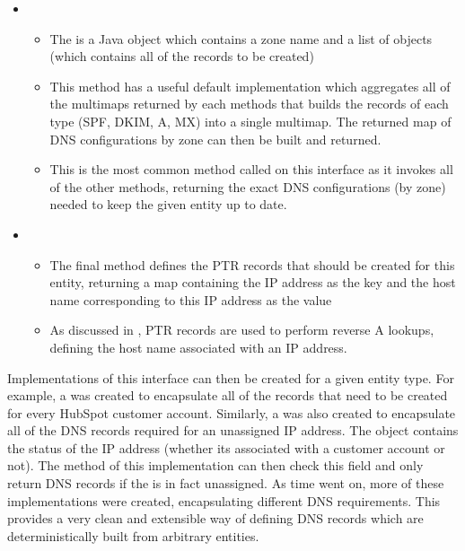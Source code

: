 \begin{itemize}
      \item{}
      \begin{itemize}
            \item{The  is a Java object which contains a zone name and a list of  objects (which contains all of the records to be created)}
            \item{This method has a useful default implementation which aggregates all of the multimaps returned by each methods that builds the records of each type (SPF, DKIM, A, MX) into a single multimap. The returned map of DNS configurations by zone can then be built and returned.}
            \item{This is the most common method called on this interface as it invokes all of the other methods, returning the exact DNS configurations (by zone) needed to keep the given entity up to date.}
      \end{itemize}

      \item{}
      \begin{itemize}
            \item{The final method defines the PTR records that should be created for this entity, returning a map containing the IP address as the key and the host name corresponding to this IP address as the value}
            \item{As discussed in , PTR records are used to perform reverse A lookups, defining the host name associated with an IP address.}
      \end{itemize}
\end{itemize}

Implementations of this interface can then be created for a given entity type. For example, a  was created to encapsulate all of the records that need to be created for every HubSpot customer account. Similarly, a  was also created to encapsulate all of the DNS records required for an unassigned IP address. The  object contains the status of the IP address (whether its associated with a customer account or not). The  method of this implementation can then check this field and only return DNS records if the  is in fact unassigned. As time went on, more of these  implementations were created, encapsulating different DNS requirements. This provides a very clean and extensible way of defining DNS records which are deterministically built from arbitrary entities.

